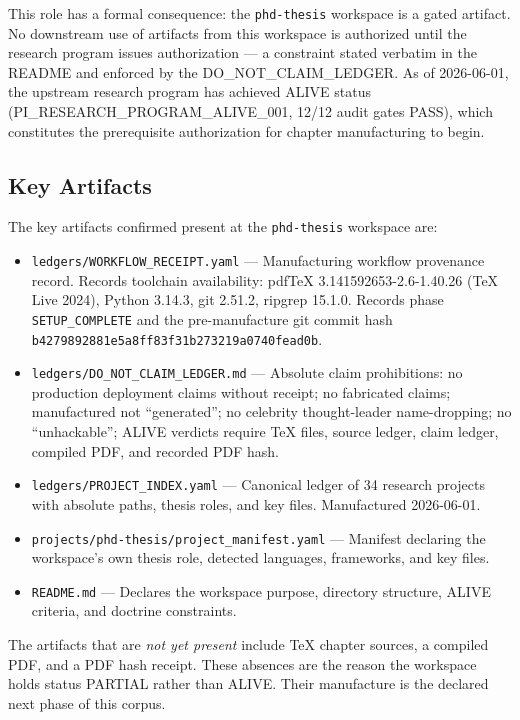 This role has a formal consequence: the \texttt{phd-thesis} workspace is a gated artifact.
No downstream use of artifacts from this workspace is authorized until the research program
issues authorization --- a constraint stated verbatim in the README and enforced by the
DO\_NOT\_CLAIM\_LEDGER. As of 2026-06-01, the upstream research program has achieved ALIVE
status (PI\_RESEARCH\_PROGRAM\_ALIVE\_001, 12/12 audit gates PASS), which constitutes the
prerequisite authorization for chapter manufacturing to begin.

\subsection{Key Artifacts}
\label{sec:phd-thesis-identity-artifacts}

The key artifacts confirmed present at the \texttt{phd-thesis} workspace are:

\begin{itemize}
  \item \texttt{ledgers/WORKFLOW\_RECEIPT.yaml} --- Manufacturing workflow provenance record.
    Records toolchain availability: pdfTeX 3.141592653-2.6-1.40.26 (TeX Live 2024),
    Python 3.14.3, git 2.51.2, ripgrep 15.1.0. Records phase \texttt{SETUP\_COMPLETE}
    and the pre-manufacture git commit hash
    \texttt{b4279892881e5a8ff83f31b273219a0740fead0b}.
  \item \texttt{ledgers/DO\_NOT\_CLAIM\_LEDGER.md} --- Absolute claim prohibitions:
    no production deployment claims without receipt; no fabricated claims; manufactured
    not ``generated''; no celebrity thought-leader name-dropping; no ``unhackable'';
    ALIVE verdicts require TeX files, source ledger, claim ledger, compiled PDF, and
    recorded PDF hash.
  \item \texttt{ledgers/PROJECT\_INDEX.yaml} --- Canonical ledger of 34 research projects
    with absolute paths, thesis roles, and key files. Manufactured 2026-06-01.
  \item \texttt{projects/phd-thesis/project\_manifest.yaml} --- Manifest declaring the
    workspace's own thesis role, detected languages, frameworks, and key files.
  \item \texttt{README.md} --- Declares the workspace purpose, directory structure,
    ALIVE criteria, and doctrine constraints.
\end{itemize}

The artifacts that are \emph{not yet present} include TeX chapter sources, a compiled PDF,
and a PDF hash receipt. These absences are the reason the workspace holds status PARTIAL
rather than ALIVE. Their manufacture is the declared next phase of this corpus.
